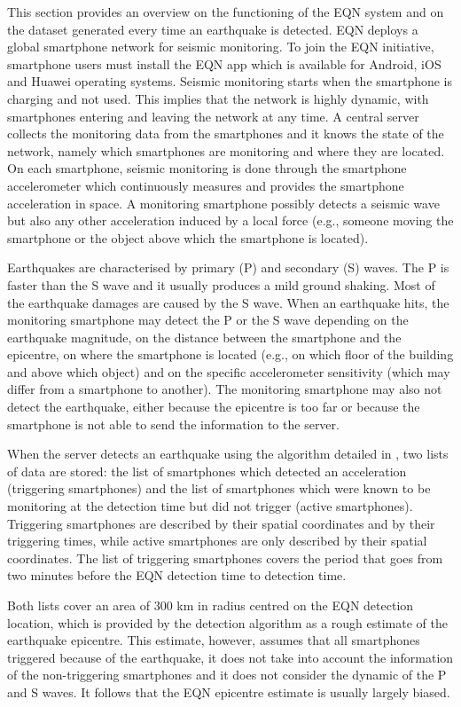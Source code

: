\documentclass[final]{statsoc}
\begin{document}
This section provides an overview on the functioning of the EQN system and on the dataset generated every time an earthquake is detected. EQN deploys a global smartphone network for seismic monitoring. To join the EQN initiative, smartphone users must install the EQN app which is available for Android, iOS and Huawei operating systems. Seismic monitoring starts when the smartphone is charging and not used. This implies that the network is highly dynamic, with smartphones entering and leaving the network at any time. A central server collects the monitoring data from the smartphones and it knows the state of the network, namely which smartphones are monitoring and where they are located. On each smartphone, seismic monitoring is done through the smartphone accelerometer which continuously measures and provides the smartphone acceleration in space. A monitoring smartphone possibly detects a seismic wave but also any other acceleration induced by a local force (e.g., someone moving the smartphone or the object above which the smartphone is located). 

Earthquakes are characterised by primary (P) and secondary (S) waves. The P is faster than the S wave and it usually produces a mild ground shaking. Most of the earthquake damages are caused by the S wave. When an earthquake hits, the monitoring smartphone may detect the P or the S wave depending on the earthquake magnitude, on the distance between the smartphone and the epicentre, on where the smartphone is located (e.g., on which floor of the building and above which object) and on the specific accelerometer sensitivity (which may differ from a smartphone to another). The monitoring smartphone may also not detect the earthquake, either because the epicentre is too far or because the smartphone is not able to send the information to the server.

When the server detects an earthquake using the algorithm detailed in \cite{finazzi2017statistical}, two lists of data are stored: the list of smartphones which detected an acceleration (triggering smartphones) and the list of smartphones which were known to be monitoring at the detection time but did not trigger (active smartphones). Triggering smartphones are described by their spatial coordinates and by their triggering times, while active smartphones are only described by their spatial coordinates. The list of triggering smartphones covers the period that goes from two minutes before the EQN detection time to detection time.

Both lists cover an area of $300$ km in radius centred on the EQN detection location, which is provided by the detection algorithm as a rough estimate of the earthquake epicentre. This estimate, however, assumes that all smartphones triggered because of the earthquake, it does not take into account the information of the non-triggering smartphones and it does not consider the dynamic of the P and S waves. It follows that the EQN epicentre estimate is usually largely biased.
\end{document}
